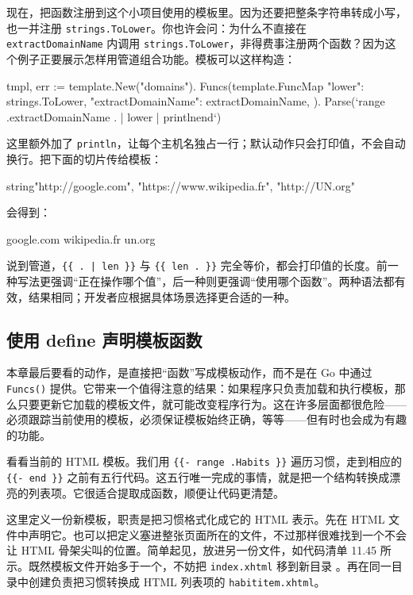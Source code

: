 现在，把函数注册到这个小项目使用的模板里。因为还要把整条字符串转成小写，也一并注册 \texttt{strings.ToLower}。你也许会问：为什么不直接在 \texttt{extractDomainName} 内调用 \texttt{strings.ToLower}，非得费事注册两个函数？因为这个例子正要展示怎样用管道组合功能。模板可以这样构造：

\begin{gocode}[title={代码清单 11.44 注册管道中的全部函数}]
tmpl, err := template.New("domains").
    Funcs(template.FuncMap{
        "lower":             strings.ToLower,
        "extractDomainName": extractDomainName,
    }).
    Parse(`{{range .}}{{extractDomainName . | lower | println}}{{end}}`)
\end{gocode}

这里额外加了 \texttt{println}，让每个主机名独占一行；默认动作只会打印值，不会自动换行。把下面的切片传给模板：

\begin{gocode}[]
[]string{"http://google.com", "https://www.wikipedia.fr", "http://UN.org"}
\end{gocode}

会得到：

\begin{plaincode}[]
google.com
wikipedia.fr
un.org
\end{plaincode}

说到管道，\texttt{\{\{ . | len \}\}} 与 \texttt{\{\{ len . \}\}} 完全等价，都会打印值的长度。前一种写法更强调“正在操作哪个值”，后一种则更强调“使用哪个函数”。两种语法都有效，结果相同；开发者应根据具体场景选择更合适的一种。

\subsection{使用 define 声明模板函数}

本章最后要看的动作，是直接把“函数”写成模板动作，而不是在 Go 中通过 \texttt{Funcs()} 提供。它带来一个值得注意的结果：如果程序只负责加载和执行模板，那么只要更新它加载的模板文件，就可能改变程序行为。这在许多层面都很危险——必须跟踪当前使用的模板，必须保证模板始终正确，等等——但有时也会成为有趣的功能。

看看当前的 HTML 模板。我们用 \texttt{\{\{- range .Habits \}\}} 遍历习惯，走到相应的 \texttt{\{\{- end \}\}} 之前有五行代码。这五行唯一完成的事情，就是把一个结构转换成漂亮的列表项。它很适合提取成函数，顺便让代码更清楚。

这里定义一份新模板，职责是把习惯格式化成它的 HTML 表示。先在 HTML 文件中声明它。也可以把定义塞进整张页面所在的文件，不过那样很难找到一个不会让 HTML 骨架尖叫的位置。简单起见，放进另一份文件，如代码清单 11.45 所示。既然模板文件开始多于一个，不妨把 \texttt{index.xhtml} 移到新目录 。再在同一目录中创建负责把习惯转换成 HTML 列表项的 \texttt{habititem.xhtml}。

